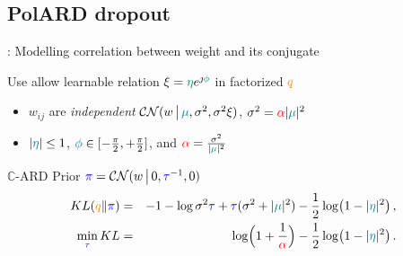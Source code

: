 \documentclass{beamer}
\newcommand{\cplx}{\mathbb{C}}
\newcommand{\iu}{{\jmath}}
\begin{document}
\subsection{PolARD dropout} %
\label{sub:polarized_ard_dropout}

\begin{frame}[c]{\insertsection: \insertsubsection}
  Modelling correlation between weight and its conjugate

  \bigskip
  Use allow learnable relation $
    \xi = {\color{teal} \eta} e^{\iu {\color{teal} \phi}}
  $ in factorized ${\color{orange} q}$
  \begin{itemize}
    \item $w_{ij}$ are \emph{independent} $
      \mathcal{CN}(
        w\,\big\vert\,
        {\color{teal} \mu},
        \sigma^2,
        \sigma^2 \xi
      )
    $, $
      \sigma^2
        = {\color{red} \alpha} \lvert {\color{teal} \mu} \rvert^2
    $
    \item $
      \lvert {\color{teal} \eta} \rvert \leq 1
    $, $
      {\color{teal} \phi} \in [-\tfrac\pi2, +\tfrac\pi2]
    $, and $
      {\color{red} \alpha} = \tfrac{\sigma^2}{\lvert {\color{teal} \mu} \rvert^2}
    $
  \end{itemize}

  \pause
  \bigskip
  $\cplx$-ARD Prior $
    {\color{blue} \pi}
      = \mathcal{CN}(w\,\big\vert\, 0, {\color{blue} \tau}^{-1}, 0)
  $
  \begin{eqnarray*}
      \mathop{KL}({\color{orange} q} \| {\color{blue} \pi})
      &=& -1
        - \log \sigma^2 {\color{blue} \tau}
        + {\color{blue} \tau} (\sigma^2 + \lvert {\color{teal} \mu} \rvert^2)
        -\frac12 \log \bigl(
          1 - \lvert {\color{teal} \eta} \rvert^2
        \bigr)
      \,, \\
      \min_{{\color{blue} \tau}} KL
      &=& \log \Bigl(
          1 + \frac1{{\color{red} \alpha}}
        \Bigr)
        - \frac12 \log \bigl(
          1 - \lvert {\color{teal} \eta} \rvert^2
        \bigr)
      \,. \\
  \end{eqnarray*}
\end{frame}
\end{document}
